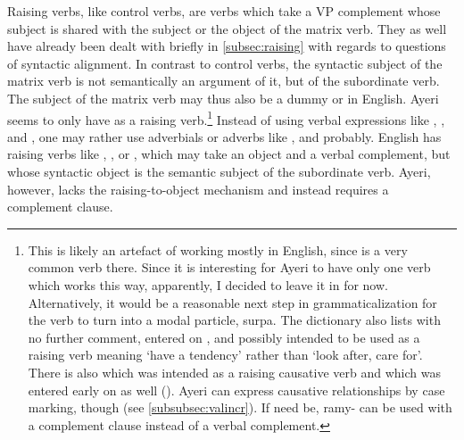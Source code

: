 Raising verbs, like control verbs, are verbs which take a VP complement whose
subject is shared with the subject or the object of the matrix verb. They as
well have already been dealt with briefly in \autoref{subsec:raising} with
regards to questions of syntactic alignment. In contrast to control verbs, the
syntactic subject of the matrix verb is not semantically an argument of it, but
of the subordinate verb. The subject of the matrix verb may thus also be a
dummy  or  in English. Ayeri seems to only have
 as a raising verb.\footnote{This is likely an
artefact of working mostly in English, since  is a very common verb
there. Since it is interesting for Ayeri to have only one verb which works this
way, apparently, I decided to leave it in for now. Alternatively, it would be a
reasonable next step in grammaticalization for the verb to turn into a modal
particle,  {surpa}. The dictionary also lists
 with no further comment, entered on
, and possibly intended to be used as a raising verb
meaning `have a tendency' rather than `look after, care for'. There is also
 which was intended as a raising causative
verb and which was entered early on as well (). Ayeri can
express causative relationships by case marking, though (see
\autoref{subsubsec:valincr}). If need be,  {ramy-} can be used with
a complement clause instead of a verbal complement.} Instead of using verbal
expressions like , , and , one may rather use
adverbials or adverbs like ,
 and  {probably}.
English has raising verbs like , , or , which may
take an object and a verbal complement, but whose syntactic object is the
semantic subject of the subordinate verb. Ayeri, however, lacks the
raising-to-object mechanism and instead requires a complement clause.

